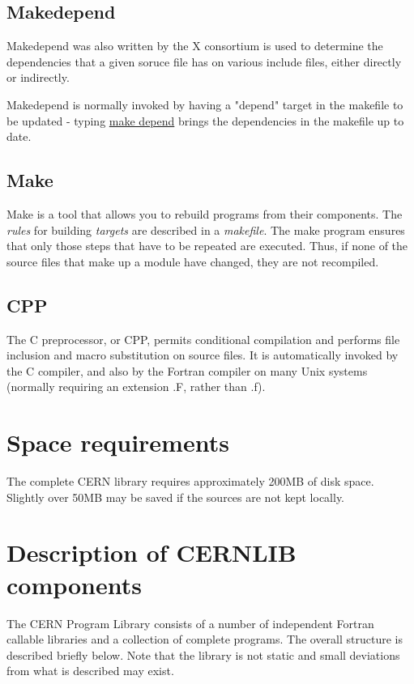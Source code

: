 \section{Makedepend}

Makedepend was also written by the X consortium is used to
determine the dependencies that a given soruce file
has on various include files, either directly or indirectly.

Makedepend is normally invoked by having a "depend" target
in the makefile to be updated - typing \underline{make depend}
brings the dependencies in the makefile up to date.

\section{Make}

Make is a tool that allows you to rebuild programs
from their components. The {\it rules} for building {\it targets}
are described in a {\it makefile}. The make program ensures
that only those steps that have to be repeated are executed.
Thus, if none of the source files that make up a module have changed, 
they are not recompiled. 

\section{CPP}

The C preprocessor, or CPP, permits conditional compilation and 
performs file inclusion and macro substitution on
source files. It is automatically invoked by the C compiler, and also by
the Fortran compiler on many Unix systems (normally requiring an extension
.F, rather than .f).

\chapter{Space requirements}


The complete CERN library requires approximately 200MB of disk
space. Slightly over 50MB may be saved if the sources are not
kept locally.

\chapter{Description of CERNLIB components}

The CERN Program Library consists of a number of independent
Fortran callable libraries and a collection of complete
programs. The overall structure is described briefly below.
Note that the library is not static and small deviations
from what is described may exist.

